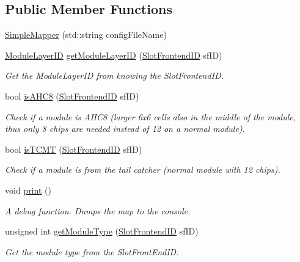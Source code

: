 \subsection*{Public Member Functions}
\begin{DoxyCompactItemize}
\item 
\hyperlink{class_simple_mapper_aac9a4d9921f0f079f2f0a4778a83c27d}{SimpleMapper} (std::string configFileName)
\item 
\hyperlink{class_simple_mapper_a6fbef133414fb482f870ab56e7237682}{ModuleLayerID} \hyperlink{class_simple_mapper_a33ffad5d6bdccd5347630b65764e4b99}{getModuleLayerID} (\hyperlink{class_simple_mapper_a2b973730223591df7c876a6dfbb922a0}{SlotFrontendID} sfID)
\begin{DoxyCompactList}\small\item\em Get the ModuleLayerID from knowing the SlotFrontendID. \item\end{DoxyCompactList}\item 
bool \hyperlink{class_simple_mapper_a02936c8c25f05737945901618a777515}{isAHC8} (\hyperlink{class_simple_mapper_a2b973730223591df7c876a6dfbb922a0}{SlotFrontendID} sfID)
\begin{DoxyCompactList}\small\item\em Check if a module is AHC8 (larger 6x6 cells also in the middle of the module, thus only 8 chips are needed instead of 12 on a normal module). \item\end{DoxyCompactList}\item 
bool \hyperlink{class_simple_mapper_a09cf4f914abaad39fc4cc039f4e41ea2}{isTCMT} (\hyperlink{class_simple_mapper_a2b973730223591df7c876a6dfbb922a0}{SlotFrontendID} sfID)
\begin{DoxyCompactList}\small\item\em Check if a module is from the tail catcher (normal module with 12 chips). \item\end{DoxyCompactList}\item 
void \hyperlink{class_simple_mapper_a0cfad0a5093ba57a9540b99f850cd474}{print} ()
\begin{DoxyCompactList}\small\item\em A debug function. Dumps the map to the console. \item\end{DoxyCompactList}\item 
unsigned int \hyperlink{class_simple_mapper_a857de2500f82b01e1a6f116df8aed8a6}{getModuleType} (\hyperlink{class_simple_mapper_a2b973730223591df7c876a6dfbb922a0}{SlotFrontendID} sfID)
\begin{DoxyCompactList}\small\item\em Get the module type from the SlotFrontEndID. \item\end{DoxyCompactList}\end{DoxyCompactItemize}
